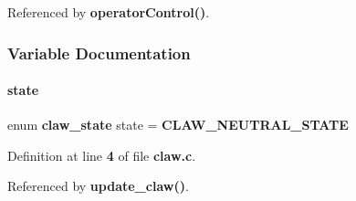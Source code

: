 Referenced by \textbf{ operator\+Control()}.



\subsubsection{Variable Documentation}
\mbox{\label{claw_8c_a70d16bb05218682b0a5eaabb141e9d8f}} 
\paragraph{state}
{\footnotesize\ttfamily enum \textbf{ claw\+\_\+state} state = \textbf{ C\+L\+A\+W\+\_\+\+N\+E\+U\+T\+R\+A\+L\+\_\+\+S\+T\+A\+TE}\hspace{0.3cm}{\ttfamily [static]}}



Definition at line \textbf{ 4} of file \textbf{ claw.\+c}.



Referenced by \textbf{ update\+\_\+claw()}.


